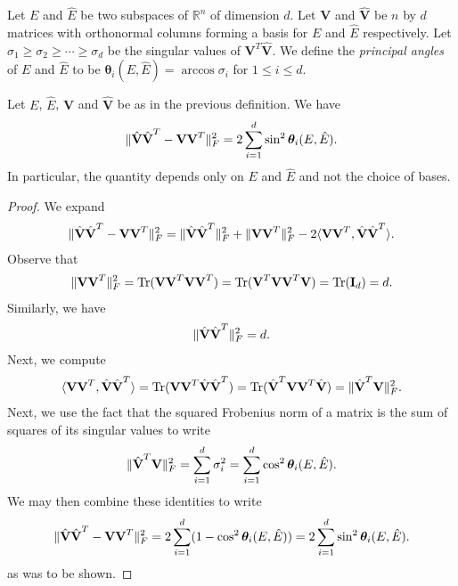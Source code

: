 \documentclass[final,12pt]{colt2018} %
\numberwithin{equation}{section}
\DeclarePairedDelimiter{\norm}{\lVert}{\rVert}
\DeclarePairedDelimiter{\paren}{(}{)}
\DeclarePairedDelimiter{\inprod}{\langle}{\rangle}
\newcommand{\R}{\mathbb{R}}
\newcommand{\boldtheta}{\boldsymbol{\theta}}
\newcommand{\boldI}{\textbf{I}}
\begin{document}
\begin{definition}
	Let $E$ and $\hat{E}$ be two subspaces of $\R^n$ of dimension $d$. Let $\textbf{V}$ and $\hat{\textbf{V}}$ be $n$ by $d$ matrices with orthonormal columns forming a basis for $E$ and $\hat{E}$ respectively. Let $\sigma_1 \geq \sigma_2 \geq \cdots \geq \sigma_d$ be the singular values of $\textbf{V}^T\hat{\textbf{V}}$. We define the \emph{principal angles} of $E$ and $\hat{E}$ to be $\boldtheta_i(E,\hat{E}) = \arccos\sigma_i$ for $1 \leq i \leq d$.
\end{definition}

\begin{lemma}
	Let $E$, $\hat{E}$, $\textbf{V}$ and $\hat{\textbf{V}}$ be as in the previous definition. We have
	\begin{equation}
	\norm{\hat{\textbf{V}}\hat{\textbf{V}}^T - \textbf{V}\textbf{V}^T}^2_F = 2\sum_{i=1}^d \sin^2\boldtheta_i(E,\hat{E}).
	\end{equation}
	In particular, the quantity depends only on $E$ and $\hat{E}$ and not the choice of bases.
\end{lemma}

\begin{proof}
	We expand
	\begin{align}
	\norm{\hat{\textbf{V}}\hat{\textbf{V}}^T - \textbf{V}\textbf{V}^T}^2_F = \norm{\hat{\textbf{V}}\hat{\textbf{V}}^T}_F^2 + \norm{\textbf{V}\textbf{V}^T}^2_F - 2\inprod{\textbf{V}\textbf{V}^T,\hat{\textbf{V}}\hat{\textbf{V}}^T}.
	\end{align}
	Observe that
	\begin{align}
	\norm{\textbf{V}\textbf{V}^T}^2_F = \textnormal{Tr}\paren{\textbf{V}\textbf{V}^T\textbf{V}\textbf{V}^T} = \textnormal{Tr}\paren{\textbf{V}^T\textbf{V}\textbf{V}^T\textbf{V}} = \textnormal{Tr}\paren{\boldI_d} = d.
	\end{align}
	Similarly, we have
	\begin{align}
	\norm{\hat{\textbf{V}}\hat{\textbf{V}}^T}_F^2 = d.
	\end{align}
	Next, we compute
	\begin{align}
	\inprod{\textbf{V}\textbf{V}^T,\hat{\textbf{V}}\hat{\textbf{V}}^T} = \textnormal{Tr}\paren{\textbf{V}\textbf{V}^T\hat{\textbf{V}}\hat{\textbf{V}}^T} = \textnormal{Tr}\paren{\hat{\textbf{V}}^T\textbf{V}\textbf{V}^T\hat{\textbf{V}}} = \norm{\hat{\textbf{V}}^T\textbf{V}}_F^2.
	\end{align}
	Next, we use the fact that the squared Frobenius norm of a matrix is the sum of squares of its singular values to write
	\begin{align}
	\norm{\hat{\textbf{V}}^T\textbf{V}}_F^2 = \sum_{i=1}^d\sigma_i^2 = \sum_{i=1}^d \cos^2\boldtheta_i(E,\hat{E}).
	\end{align}
	We may then combine these identities to write
	\begin{align}
	\norm{\hat{\textbf{V}}\hat{\textbf{V}}^T - \textbf{V}\textbf{V}^T}^2_F = 2\sum_{i=1}^d(1-\cos^2\boldtheta_i(E,\hat{E})) = 2\sum_{i=1}^d\sin^2\boldtheta_i(E,\hat{E}).
	\end{align}
	as was to be shown.
\end{proof}
\end{document}
